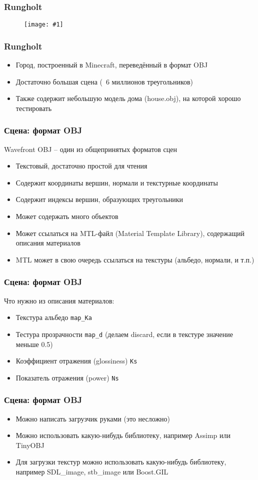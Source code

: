\documentclass{beamer}
\newcommand{\slideimage}[1]{
  \begin{figure}
    \begin{adjustbox}{width=\textwidth, totalheight=\textheight-2\baselineskip-2\baselineskip,keepaspectratio}
      \texttt{[image: \#1]}
    \end{adjustbox}
  \end{figure}
}
\begin{document}
\begin{frame}[fragile]
\frametitle{Rungholt}
\slideimage{rungholt.png}
\end{frame}

\begin{frame}[fragile]
\frametitle{Rungholt}
\begin{itemize}
\item Город, построенный в Minecraft, переведённый в формат OBJ
\item Достаточно большая сцена (~6 миллионов треугольников)
\item Также содержит небольшую модель дома (house.obj), на которой хорошо тестировать
\end{itemize}
\end{frame}

\begin{frame}[fragile]
\frametitle{Сцена: формат OBJ}
Wavefront OBJ -- один из общепринятых форматов сцен
\begin{itemize}
\item Текстовый, достаточно простой для чтения
\item Содержит координаты вершин, нормали и текстурные координаты
\item Содержит индексы вершин, образующих треугольники
\item Может содержать много объектов
\item Может ссылаться на MTL-файл (Material Template Library), содержащий описания материалов
\item MTL может в свою очередь ссылаться на текстуры (альбедо, нормали, и т.п.)
\end{itemize}
\end{frame}

\begin{frame}[fragile]
\frametitle{Сцена: формат OBJ}
Что нужно из описания материалов:
\begin{itemize}
\item Текстура альбедо \verb|map_Ka|
\item Тестура прозрачности \verb|map_d| (делаем discard, если в текстуре значение меньше 0.5)
\item Коэффициент отражения (glossiness) \verb|Ks|
\item Показатель отражения (power) \verb|Ns|
\end{itemize}
\end{frame}

\begin{frame}[fragile]
\frametitle{Сцена: формат OBJ}
\begin{itemize}
\item Можно написать загрузчик руками (это несложно)
\item Можно использовать какую-нибудь библиотеку, например Assimp или TinyOBJ
\item Для загрузки текстур можно использовать какую-нибудь библиотеку, например SDL\_image, stb\_image или Boost.GIL
\end{itemize}
\end{frame}
\end{document}

